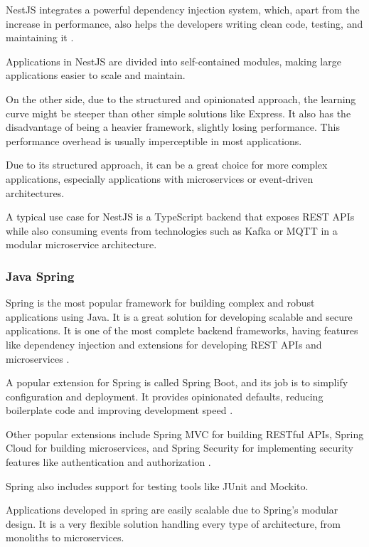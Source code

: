 NestJS integrates a powerful dependency injection system, which, apart from the
increase in performance, also helps the developers writing clean code, testing,
and maintaining it \cite{nestJS}.

Applications in NestJS are divided into
self-contained modules, making large applications easier to scale and maintain.

On the other side, due to the structured and opinionated approach, the learning
curve might be steeper than other simple solutions like Express.
It also has the disadvantage of being a heavier framework, slightly losing
performance. This performance overhead is usually imperceptible in most
applications.

Due to its structured approach, it can be a great choice for more complex
applications, especially applications with microservices or event-driven
architectures.

A typical use case for NestJS is a TypeScript backend that exposes \gls{REST}
\gls{API}s while also consuming events from technologies such as Kafka or
\gls{MQTT} in a modular microservice architecture.

\subsubsection{Java Spring}
Spring is the most popular framework for building complex and robust
applications using Java. It is a great solution for developing scalable and secure
applications. It is one of the most complete backend frameworks, having features
like dependency injection and extensions for developing \gls{REST} \gls{API}s and
microservices \cite{GFGJava}.

A popular extension for Spring is called Spring Boot, and its job is to
simplify configuration and deployment. It provides opinionated defaults,
reducing boilerplate code and improving development speed \cite{GFGJava}.

Other popular extensions include Spring \gls{MVC} for building \gls{REST}ful \gls{API}s, Spring
Cloud for building microservices, and Spring Security for implementing
security features like authentication and authorization \cite{GFGJava}.

Spring also includes support for testing tools like JUnit and Mockito.

Applications developed in spring are easily scalable due to Spring's modular
design.
It is a very flexible solution handling every type of architecture, from
monoliths to microservices.


